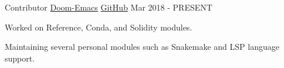 

\begin{cventries}

  \cventry
    {Contributor} %
    {\href{https://github.com/hlissner/doom-emacs}{Doom-Emacs}} %
    {\href{https://github.com/hlissner/doom-emacs}{GitHub}} %
    {Mar 2018 - PRESENT} %
    {
      \begin{cvitems} %
        \item {Worked on Reference, Conda, and Solidity modules.}
        \item {Maintaining several personal modules such as Snakemake and LSP language support.}
      \end{cvitems}
    }



\end{cventries}
